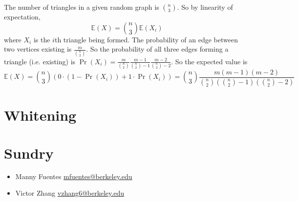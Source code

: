 \documentclass{article}
\newcommand{\E}{\mathbb{E}}
\begin{document}
The number of triangles in a given random graph is \(\binom{n}{3}\).
So by linearity of expectation,
\begin{equation}
    \E(X) = \binom{n}{3} \E(X_i)
\end{equation}
where \(X_i\) is the \(i\)th triangle being formed.
The probability of an edge between two vertices existing is \(\frac{m}{\binom{n}{2}}\).
So the probability of all three edges forming a triangle (i.e. existing) is \(\Pr(X_i) = \frac{m}{\binom{n}{2}} \frac{m - 1}{\binom{n}{2} - 1} \frac{m - 2}{\binom{n}{2} - 2}\).
So the expected value is
\begin{equation}
    \E(X) = \binom{n}{3} (0 \cdot (1 - \Pr(X_i)) + 1 \cdot \Pr(X_i)) = \binom{n}{3} \frac{m (m - 1) (m - 2)}{\binom{n}{2} \left(\binom{n}{2} - 1\right) \left(\binom{n}{2} - 2\right)}
\end{equation}

\section{Whitening}

\section{Sundry}

\begin{itemize}
    \item Manny Fuentes \href{mailto:mfuentes@berkeley.edu}{mfuentes@berkeley.edu}
    \item Victor Zhang \href{mailto:vzhang6@berkeley.edu}{vzhang6@berkeley.edu}
\end{itemize}
\end{document}

